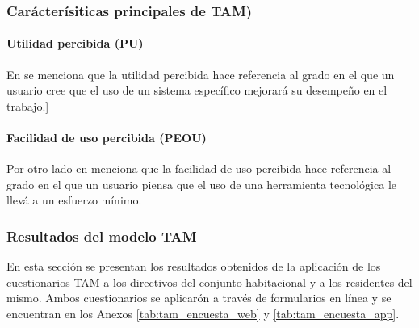 \subsubsection{Carácterísiticas principales de TAM)}\label{subsubsec:utilidad-percibida}
\paragraph{Utilidad percibida (PU)}
En \cite{varela_modelo_2010} se menciona que la utilidad percibida hace referencia al grado en el que un usuario cree que el uso de un sistema específico mejorará su desempeño en el trabajo.]
\paragraph{Facilidad de uso percibida (PEOU)}
Por otro lado en \cite{tapia_leon_comparacion_2015} menciona que la facilidad de uso percibida hace referencia al grado en el que un usuario piensa que el uso de una herramienta tecnológica le llevá a un esfuerzo mínimo.

\subsubsection{Resultados del modelo TAM}\label{subsubsec:cuestionarios-tam}
En esta sección se presentan los resultados obtenidos de la aplicación de los cuestionarios TAM a los directivos del conjunto habitacional y a los residentes del mismo.
Ambos cuestionarios se aplicarón a través de formularios en línea y se encuentran en los Anexos \ref{tab:tam_encuesta_web} y \ref{tab:tam_encuesta_app}.

